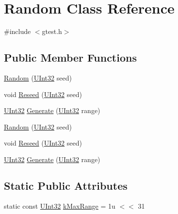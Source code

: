 \hypertarget{classtesting_1_1internal_1_1Random}{\section{\-Random \-Class \-Reference}
\label{dc/d5a/classtesting_1_1internal_1_1Random}
}


{\ttfamily \#include $<$gtest.\-h$>$}

\subsection*{\-Public \-Member \-Functions}
\begin{DoxyCompactItemize}
\item 
\hyperlink{classtesting_1_1internal_1_1Random_a453a5749cc9fc152efc2a17483bddb84}{\-Random} (\hyperlink{namespacetesting_1_1internal_a03df445d5850459574de6ffb6f57ae95}{\-U\-Int32} seed)
\item 
void \hyperlink{classtesting_1_1internal_1_1Random_aaca1e9a7a7bc2a613347117db7ab28b1}{\-Reseed} (\hyperlink{namespacetesting_1_1internal_a03df445d5850459574de6ffb6f57ae95}{\-U\-Int32} seed)
\item 
\hyperlink{namespacetesting_1_1internal_a03df445d5850459574de6ffb6f57ae95}{\-U\-Int32} \hyperlink{classtesting_1_1internal_1_1Random_aeee93742520cd3aec74fc709afea415e}{\-Generate} (\hyperlink{namespacetesting_1_1internal_a03df445d5850459574de6ffb6f57ae95}{\-U\-Int32} range)
\item 
\hyperlink{classtesting_1_1internal_1_1Random_a453a5749cc9fc152efc2a17483bddb84}{\-Random} (\hyperlink{namespacetesting_1_1internal_a03df445d5850459574de6ffb6f57ae95}{\-U\-Int32} seed)
\item 
void \hyperlink{classtesting_1_1internal_1_1Random_aaca1e9a7a7bc2a613347117db7ab28b1}{\-Reseed} (\hyperlink{namespacetesting_1_1internal_a03df445d5850459574de6ffb6f57ae95}{\-U\-Int32} seed)
\item 
\hyperlink{namespacetesting_1_1internal_a03df445d5850459574de6ffb6f57ae95}{\-U\-Int32} \hyperlink{classtesting_1_1internal_1_1Random_aeee93742520cd3aec74fc709afea415e}{\-Generate} (\hyperlink{namespacetesting_1_1internal_a03df445d5850459574de6ffb6f57ae95}{\-U\-Int32} range)
\end{DoxyCompactItemize}
\subsection*{\-Static \-Public \-Attributes}
\begin{DoxyCompactItemize}
\item 
static const \hyperlink{namespacetesting_1_1internal_a03df445d5850459574de6ffb6f57ae95}{\-U\-Int32} \hyperlink{classtesting_1_1internal_1_1Random_ada5e9bee8921dfbbe2b6ef1661995016}{k\-Max\-Range} = 1u $<$$<$ 31
\end{DoxyCompactItemize}
